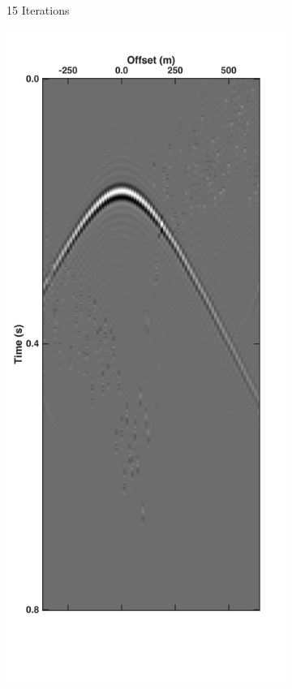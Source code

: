\begin{figure}
\begin{subfigure}[t]{0.25\textwidth}
		\caption{15 Iterations}
		\label{fig:Ch-Theory-DeblendedCRG15}
	\end{subfigure}
	\begin{subfigure}[t]{0.25\textwidth}
		\includegraphics[width=\textwidth]{Plots/Mahdad/20iter/DeblendedCRG_rec30}	

\end{subfigure}
\end{figure}
